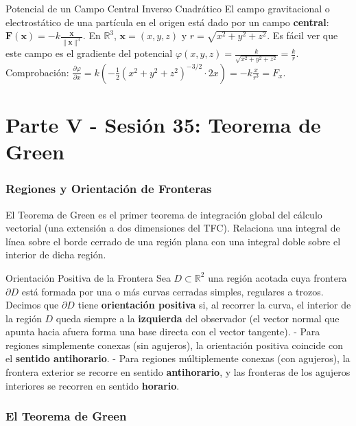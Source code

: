 \documentclass[11pt,a4paper]{article}
\begin{document}
\begin{observacionbox}{Potencial de un Campo Central Inverso Cuadrático}
El campo gravitacional o electrostático de una partícula en el origen está dado por un campo \textbf{central}:
$\mathbf{F}(\mathbf{x}) = -k \frac{\mathbf{x}}{\|\mathbf{x}\|^3}$. En $\mathbb{R}^3$, $\mathbf{x} = (x,y,z)$ y $r = \sqrt{x^2+y^2+z^2}$.
Es fácil ver que este campo es el gradiente del potencial $\varphi(x,y,z) = \frac{k}{\sqrt{x^2+y^2+z^2}} = \frac{k}{r}$.
Comprobación: $\frac{\partial \varphi}{\partial x} = k \left( -\frac{1}{2} (x^2+y^2+z^2)^{-3/2} \cdot 2x \right) = -k\frac{x}{r^3} = F_x$.
\end{observacionbox}

\part*{Parte V - Sesión 35: Teorema de Green}

\section{Regiones y Orientación de Fronteras}

El Teorema de Green es el primer teorema de integración global del cálculo vectorial (una extensión a dos dimensiones del TFC). Relaciona una integral de línea sobre el borde cerrado de una región plana con una integral doble sobre el interior de dicha región.

\begin{definicionbox}{Orientación Positiva de la Frontera}
Sea $D \subset \mathbb{R}^2$ una región acotada cuya frontera $\partial D$ está formada por una o más curvas cerradas simples, regulares a trozos. Decimos que $\partial D$ tiene \textbf{orientación positiva} si, al recorrer la curva, el interior de la región $D$ queda siempre a la \textbf{izquierda} del observador (el vector normal que apunta hacia afuera forma una base directa con el vector tangente).
- Para regiones simplemente conexas (sin agujeros), la orientación positiva coincide con el \textbf{sentido antihorario}.
- Para regiones múltiplemente conexas (con agujeros), la frontera exterior se recorre en sentido \textbf{antihorario}, y las fronteras de los agujeros interiores se recorren en sentido \textbf{horario}.
\end{definicionbox}

\section{El Teorema de Green}
\end{document}
